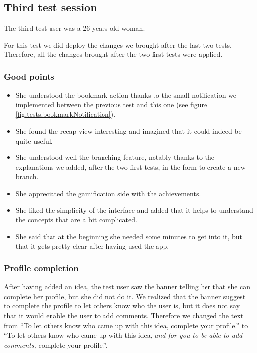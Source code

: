 \documentclass[a4paper,12pt,twoside]{article}
\begin{document}
\FloatBarrier
\subsection{Third test session}
The third test user was a 26 years old woman.

For this test we did deploy the changes we brought after the last two tests.
Therefore, all the changes brought after the two first tests were applied.

\subsubsection*{Good points}
\begin{itemize}
    \item She understood the bookmark action thanks to the small notification we implemented between the previous test and this one (see figure \ref{fig.tests.bookmarkNotification}).
    \item She found the recap view interesting and imagined that it could indeed be quite useful.
    \item She understood well the branching feature, notably thanks to the explanations we added, after the two first tests, in the form to create a new branch.
    \item She appreciated the gamification side with the achievements.
    \item She liked the simplicity of the interface and added that it helps to understand the concepts that are a bit complicated.
    \item She said that at the beginning she needed some minutes to get into it, but that it gets pretty clear after having used the app.
\end{itemize}

\subsubsection*{Profile completion}
After having added an idea, the test user saw the banner telling her that she can complete her profile, but she did not do it.
We realized that the banner suggest to complete the profile to let others know who the user is, but it does not say that it would enable the user to add comments.
Therefore we changed the text from “To let others know who came up with this idea, complete your profile.” to “To let others know who came up with this idea, \emph{and for you to be able to add comments,} complete your profile.”.
\end{document}
